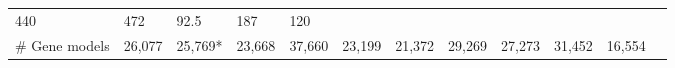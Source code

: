 \documentclass[]{elsarticle} %
\begin{document}
\begin{longtable}[]{@{}llllllllllll@{}}
\begin{minipage}[t]{0.05\columnwidth}
440\strut
\end{minipage} & \begin{minipage}[t]{0.05\columnwidth}\raggedright\strut
472\strut
\end{minipage} & \begin{minipage}[t]{0.05\columnwidth}\raggedright\strut
92.5\strut
\end{minipage} & \begin{minipage}[t]{0.05\columnwidth}\raggedright\strut
187\strut
\end{minipage} & \begin{minipage}[t]{0.05\columnwidth}\raggedright\strut
120\strut
\end{minipage}\tabularnewline
\begin{minipage}[t]{0.15\columnwidth}\raggedright\strut
\# Gene models\strut
\end{minipage} & \begin{minipage}[t]{0.05\columnwidth}\raggedright\strut
26,077\strut
\end{minipage} & \begin{minipage}[t]{0.05\columnwidth}\raggedright\strut
25,769*\strut
\end{minipage} & \begin{minipage}[t]{0.05\columnwidth}\raggedright\strut
23,668\strut
\end{minipage} & \begin{minipage}[t]{0.05\columnwidth}\raggedright\strut
37,660\strut
\end{minipage} & \begin{minipage}[t]{0.05\columnwidth}\raggedright\strut
23,199\strut
\end{minipage} & \begin{minipage}[t]{0.05\columnwidth}\raggedright\strut
21,372\strut
\end{minipage} & \begin{minipage}[t]{0.05\columnwidth}\raggedright\strut
29,269\strut
\end{minipage} & \begin{minipage}[t]{0.05\columnwidth}\raggedright\strut
27,273\strut
\end{minipage} & \begin{minipage}[t]{0.05\columnwidth}\raggedright\strut
31,452\strut
\end{minipage} & \begin{minipage}[t]{0.05\columnwidth}\raggedright\strut
16,554\strut
\end{minipage} & \begin{minipage}[t]{0.05\columnwidth}\raggedright\strut

\end{minipage}
\end{longtable}
\end{document}

